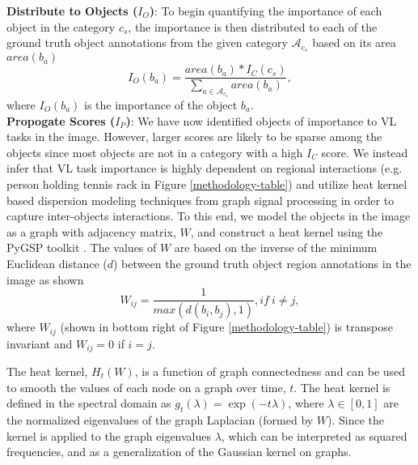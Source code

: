 \documentclass[10pt,twocolumn,letterpaper]{article}
\begin{document}
\textbf{Distribute to Objects ($I_O$)}:  To begin quantifying the importance of each object in the category $c_s$, the importance is then distributed to each of the ground truth object annotations from the given category $\mathcal{A}_{c_s}$ based on its area $area(b_a)$
\begin{equation}
I_O(b_a)=\frac{area(b_a)*I_{C}(c_s)}{\sum_{a \in \mathcal{A}_{c_s}}area(b_a)},
\end{equation}
where $I_O(b_a)$ is the importance of the object $b_a$.\vspace{1mm}\\
\textbf{Propogate Scores ($I_P$)}: We have now identified objects of importance to VL tasks in the image. However, larger scores are likely to be sparse among the objects since most objects are not in a category with a high $I_C$ score. We instead infer that VL task importance is highly dependent on regional interactions (e.g. person holding tennis rack in Figure \ref{methodology-table}) and utilize heat kernel based dispersion modeling techniques \cite{heat2008} from graph signal processing in order to capture inter-objects interactions. To this end, we model the objects in the image as a graph with adjacency matrix, $W$, and construct a heat kernel using the PyGSP toolkit \cite{gsp2017}. The values of $W$ are based on the inverse of the minimum Euclidean distance ($d$) between the ground truth object region annotations in the image as shown
\begin{equation}
W_{ij}=\frac{1}{max(d(b_{i},b_{j}),1)}, if ~ i \neq j,
\end{equation}
where $W_{ij}$ (shown in bottom right of Figure \ref{methodology-table}) is transpose invariant and $W_{ij}=0$ if $i=j$.
\par
The heat kernel, $H_{t}(W)$, is a function of graph connectedness and can be used to smooth the values of each node on a graph over time, $t$.  The heat kernel is defined in the spectral domain as $g_t(\lambda) = \exp(-t \lambda)$,
    where $\lambda \in [0, 1]$ are the normalized eigenvalues of the
    graph Laplacian (formed by $W$). Since the kernel is applied to the graph eigenvalues $\lambda$, which
    can be interpreted as squared frequencies, and as a
    generalization of the Gaussian kernel on graphs. 
\end{document}

